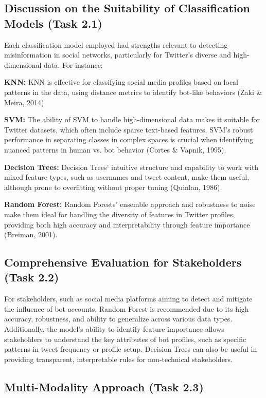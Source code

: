 \documentclass[a4paper,11pt]{article}
\begin{document}
\subsection{Discussion on the Suitability of Classification Models (Task 2.1)}

Each classification model employed had strengths relevant to detecting misinformation in social networks, particularly for Twitter's diverse and high-dimensional data. For instance:

\textbf{KNN:} KNN is effective for classifying social media profiles based on local patterns in the data, using distance metrics to identify bot-like behaviors (Zaki \& Meira, 2014).

\textbf{SVM:} The ability of SVM to handle high-dimensional data makes it suitable for Twitter datasets, which often include sparse text-based features. SVM’s robust performance in separating classes in complex spaces is crucial when identifying nuanced patterns in human vs. bot behavior (Cortes \& Vapnik, 1995).

\textbf{Decision Trees:} Decision Trees' intuitive structure and capability to work with mixed feature types, such as usernames and tweet content, make them useful, although prone to overfitting without proper tuning (Quinlan, 1986).

\textbf{Random Forest:} Random Forests' ensemble approach and robustness to noise make them ideal for handling the diversity of features in Twitter profiles, providing both high accuracy and interpretability through feature importance (Breiman, 2001).

\subsection{Comprehensive Evaluation for Stakeholders (Task 2.2)}

For stakeholders, such as social media platforms aiming to detect and mitigate the influence of bot accounts, Random Forest is recommended due to its high accuracy, robustness, and ability to generalize across various data types. Additionally, the model's ability to identify feature importance allows stakeholders to understand the key attributes of bot profiles, such as specific patterns in tweet frequency or profile setup. Decision Trees can also be useful in providing transparent, interpretable rules for non-technical stakeholders.

\subsection{Multi-Modality Approach (Task 2.3)}
\end{document}
